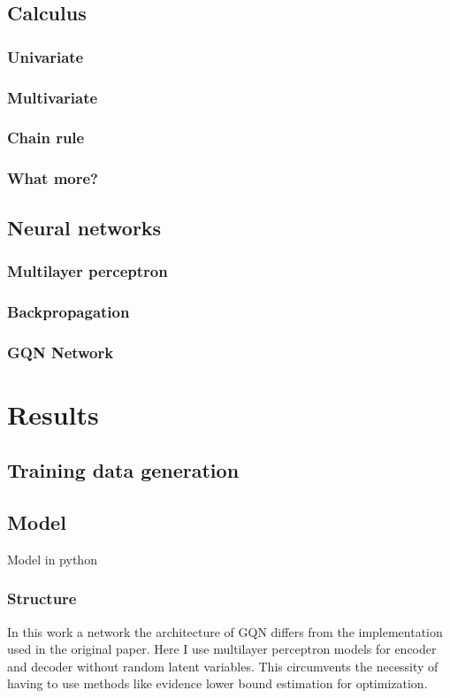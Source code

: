 \documentclass[a4paper, twoside, 10pt]{report}
\begin{document}
\section{Calculus}
\subsection{Univariate}
\subsection{Multivariate}
\subsection{Chain rule}
\subsection{What more?}
\section{Neural networks}
\subsection{Multilayer perceptron}
\subsection{Backpropagation}
\subsection{GQN Network}
\cite{gqn}

\chapter{Results}
\section{Training data generation}
\section{Model}
Model in python

\subsection{Structure}
In this work a network the architecture of GQN differs from the implementation used in the original paper. Here I use multilayer perceptron models for encoder and decoder without random latent variables. This circumvents the necessity of having to use methods like evidence lower bound estimation for optimization.
\end{document}
